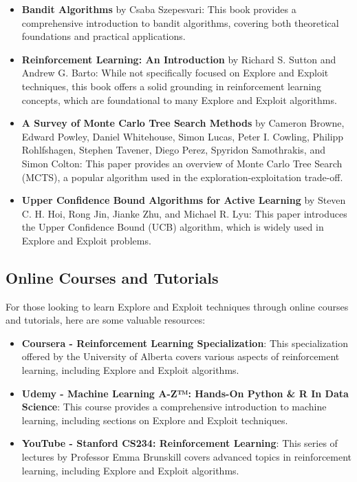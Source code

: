 \documentclass[12pt]{book} %
\begin{document}
\begin{itemize}
    \item \textbf{Bandit Algorithms} by Csaba Szepesvari: This book provides a comprehensive introduction to bandit algorithms, covering both theoretical foundations and practical applications.
    
    \item \textbf{Reinforcement Learning: An Introduction} by Richard S. Sutton and Andrew G. Barto: While not specifically focused on Explore and Exploit techniques, this book offers a solid grounding in reinforcement learning concepts, which are foundational to many Explore and Exploit algorithms.
    
    \item \textbf{A Survey of Monte Carlo Tree Search Methods} by Cameron Browne, Edward Powley, Daniel Whitehouse, Simon Lucas, Peter I. Cowling, Philipp Rohlfshagen, Stephen Tavener, Diego Perez, Spyridon Samothrakis, and Simon Colton: This paper provides an overview of Monte Carlo Tree Search (MCTS), a popular algorithm used in the exploration-exploitation trade-off.
    
    \item \textbf{Upper Confidence Bound Algorithms for Active Learning} by Steven C. H. Hoi, Rong Jin, Jianke Zhu, and Michael R. Lyu: This paper introduces the Upper Confidence Bound (UCB) algorithm, which is widely used in Explore and Exploit problems.
\end{itemize}

\subsection{Online Courses and Tutorials}
For those looking to learn Explore and Exploit techniques through online courses and tutorials, here are some valuable resources:

\begin{itemize}
    \item \textbf{Coursera - Reinforcement Learning Specialization}: This specialization offered by the University of Alberta covers various aspects of reinforcement learning, including Explore and Exploit algorithms.
    
    \item \textbf{Udemy - Machine Learning A-Z™: Hands-On Python \& R In Data Science}: This course provides a comprehensive introduction to machine learning, including sections on Explore and Exploit techniques.
    
    \item \textbf{YouTube - Stanford CS234: Reinforcement Learning}: This series of lectures by Professor Emma Brunskill covers advanced topics in reinforcement learning, including Explore and Exploit algorithms.
\end{itemize}
\end{document}
